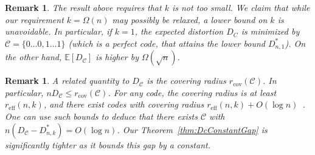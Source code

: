 \documentclass[article,doublecolumn]{IEEEtran}
\newcommand{\EE}{{\mathbb{E}}}
\newcommand{\CC}{{\mathcal{C}}}
\newcommand{\rcov}{{r_{\mathrm{cov}}}}
\newcommand{\reff}{{r_{\mathrm{eff}}}}
\newtheorem{remark}[thm]{Remark}
\begin{document}
\begin{remark}
The result above requires that $k$ is not too small. We claim that while our requirement $k=\Omega(n)$ may possibly be relaxed, a lower bound on $k$ is unavoidable. In particular, if $k=1$, the expected distortion $D_C$ is minimized by $\CC=\{0\ldots 0,1\ldots 1\}$ (which is a perfect code, that attains the lower bound $D^*_{n,1}$). On the other hand, $\EE[D_\CC]$ is higher by $\Omega(\sqrt{n})$. 
\end{remark}

\begin{remark}
A related quantity to $D_\CC$ is the covering radius $\rcov(\CC)$. In particular, $n D_\CC\leq\rcov(\CC)$. For any code, the covering radius is at least $\reff(n,k)$, and there exist codes with covering radius $\reff(n,k)+O(\log n)$~\cite{cohen1997covering}. One can use such bounds to deduce that there exists $\CC$ with $n (D_\CC-D^*_{n,k})=O(\log n)$. Our Theorem~\ref{thm:DcConstantGap} is significantly tighter as it bounds this gap by a constant.
\end{remark}
\end{document}
